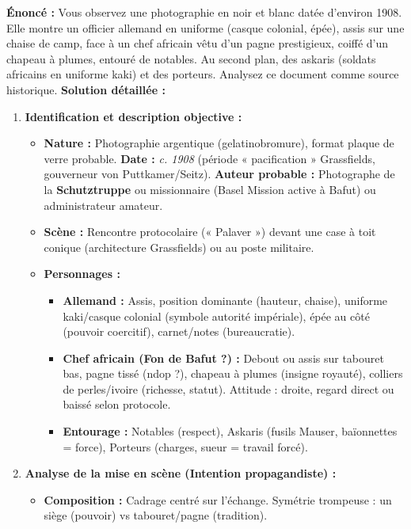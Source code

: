 \documentclass[11pt]{article}
\begin{document}
\begin{exoresolu}
\textbf{Énoncé :} Vous observez une photographie en noir et blanc datée d'environ 1908. Elle montre un officier allemand en uniforme (casque colonial, épée), assis sur une chaise de camp, face à un chef africain vêtu d'un pagne prestigieux, coiffé d'un chapeau à plumes, entouré de notables. Au second plan, des askaris (soldats africains en uniforme kaki) et des porteurs. Analysez ce document comme source historique.
\tcblower
\textbf{Solution détaillée :}
\begin{enumerate}
    \item \textbf{Identification et description objective :}
    \begin{itemize}
        \item \textbf{Nature :} Photographie argentique (gelatinobromure), format plaque de verre probable. \textbf{Date :} \emph{c. 1908} (période « pacification » Grassfields, gouverneur von Puttkamer/Seitz). \textbf{Auteur probable :} Photographe de la \textbf{Schutztruppe} ou missionnaire (Basel Mission active à Bafut) ou administrateur amateur.
        \item \textbf{Scène :} Rencontre protocolaire (« Palaver ») devant une case à toit conique (architecture Grassfields) ou au poste militaire.
        \item \textbf{Personnages :}
            \begin{itemize}
                \item \textbf{Allemand :} Assis, position dominante (hauteur, chaise), uniforme kaki/casque colonial (symbole autorité impériale), épée au côté (pouvoir coercitif), carnet/notes (bureaucratie).
                \item \textbf{Chef africain (Fon de Bafut ?) :} Debout ou assis sur tabouret bas, pagne tissé (ndop ?), chapeau à plumes (insigne royauté), colliers de perles/ivoire (richesse, statut). Attitude : droite, regard direct ou baissé selon protocole.
                \item \textbf{Entourage :} Notables (respect), Askaris (fusils Mauser, baïonnettes = force), Porteurs (charges, sueur = travail forcé).
            \end{itemize}
    \end{itemize}
    \item \textbf{Analyse de la mise en scène (Intention propagandiste) :}
    \begin{itemize}
        \item \textbf{Composition :} Cadrage centré sur l'échange. Symétrie trompeuse : un siège (pouvoir) vs tabouret/pagne (tradition).

\end{itemize}
\end{enumerate}
\end{exoresolu}
\end{document}
